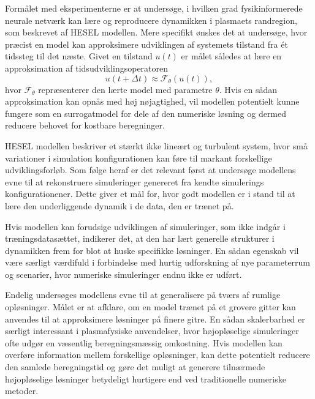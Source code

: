 Formålet med eksperimenterne er at undersøge, i hvilken grad fysikinformerede neurale netværk kan lære og reproducere dynamikken i plasmaets randregion, som beskrevet af HESEL modellen.
Mere specifikt ønskes det at undersøge, hvor præcist en model kan approksimere udviklingen af systemets tilstand fra ét tidssteg til det næste.
Givet en tilstand $u(t)$ er målet således at lære en approksimation af tidsudviklingsoperatoren
\begin{equation*}
    u(t+\Delta t) \approx \mathcal{F}_\theta(u(t)),
\end{equation*}
hvor $\mathcal{F}_\theta$ repræsenterer den lærte model med parametre $\theta$. Hvis en sådan approksimation kan opnås med høj nøjagtighed, vil modellen potentielt kunne fungere som en
surrogatmodel for dele af den numeriske løsning og dermed reducere behovet for kostbare beregninger.

HESEL modellen beskriver et stærkt ikke lineært og turbulent system, hvor små variationer i simulation konfigurationen kan føre til markant forskellige udviklingsforløb.
Som følge heraf er det relevant først at undersøge modellens evne til at rekonstruere simuleringer genereret fra kendte simulerings konfigurationener.
Dette giver et mål for, hvor godt modellen er i stand til at lære den underliggende dynamik i de data, den er trænet på.

Hvis modellen kan forudsige udviklingen af simuleringer, som ikke indgår i træningsdatasættet,
indikerer det, at den har lært generelle strukturer i dynamikken frem for blot at huske specifikke løsninger.
En sådan egenskab vil være særligt værdifuld i forbindelse med hurtig udforskning af nye parameterrum og scenarier, hvor numeriske simuleringer endnu ikke er udført.



Endelig undersøges modellens evne til at generalisere på tværs af rumlige opløsninger. Målet er at afklare, om en model trænet på et grovere gitter kan anvendes til at approksimere løsninger på finere gitre.
En sådan skalerbarhed er særligt interessant i plasmafysiske anvendelser, hvor højopløselige simuleringer ofte udgør en væsentlig beregningsmæssig omkostning.
Hvis modellen kan overføre information mellem forskellige opløsninger, kan dette potentielt reducere den samlede beregningstid og gøre det muligt at generere tilnærmede højopløselige løsninger betydeligt hurtigere end ved traditionelle numeriske metoder.


